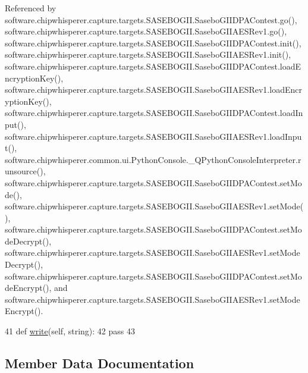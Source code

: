 Referenced by software.\+chipwhisperer.\+capture.\+targets.\+S\+A\+S\+E\+B\+O\+G\+I\+I.\+Sasebo\+G\+I\+I\+D\+P\+A\+Contest.\+go(), software.\+chipwhisperer.\+capture.\+targets.\+S\+A\+S\+E\+B\+O\+G\+I\+I.\+Sasebo\+G\+I\+I\+A\+E\+S\+Rev1.\+go(), software.\+chipwhisperer.\+capture.\+targets.\+S\+A\+S\+E\+B\+O\+G\+I\+I.\+Sasebo\+G\+I\+I\+D\+P\+A\+Contest.\+init(), software.\+chipwhisperer.\+capture.\+targets.\+S\+A\+S\+E\+B\+O\+G\+I\+I.\+Sasebo\+G\+I\+I\+A\+E\+S\+Rev1.\+init(), software.\+chipwhisperer.\+capture.\+targets.\+S\+A\+S\+E\+B\+O\+G\+I\+I.\+Sasebo\+G\+I\+I\+D\+P\+A\+Contest.\+load\+Encryption\+Key(), software.\+chipwhisperer.\+capture.\+targets.\+S\+A\+S\+E\+B\+O\+G\+I\+I.\+Sasebo\+G\+I\+I\+A\+E\+S\+Rev1.\+load\+Encryption\+Key(), software.\+chipwhisperer.\+capture.\+targets.\+S\+A\+S\+E\+B\+O\+G\+I\+I.\+Sasebo\+G\+I\+I\+D\+P\+A\+Contest.\+load\+Input(), software.\+chipwhisperer.\+capture.\+targets.\+S\+A\+S\+E\+B\+O\+G\+I\+I.\+Sasebo\+G\+I\+I\+A\+E\+S\+Rev1.\+load\+Input(), software.\+chipwhisperer.\+common.\+ui.\+Python\+Console.\+\_\+\+Q\+Python\+Console\+Interpreter.\+runsource(), software.\+chipwhisperer.\+capture.\+targets.\+S\+A\+S\+E\+B\+O\+G\+I\+I.\+Sasebo\+G\+I\+I\+D\+P\+A\+Contest.\+set\+Mode(), software.\+chipwhisperer.\+capture.\+targets.\+S\+A\+S\+E\+B\+O\+G\+I\+I.\+Sasebo\+G\+I\+I\+A\+E\+S\+Rev1.\+set\+Mode(), software.\+chipwhisperer.\+capture.\+targets.\+S\+A\+S\+E\+B\+O\+G\+I\+I.\+Sasebo\+G\+I\+I\+D\+P\+A\+Contest.\+set\+Mode\+Decrypt(), software.\+chipwhisperer.\+capture.\+targets.\+S\+A\+S\+E\+B\+O\+G\+I\+I.\+Sasebo\+G\+I\+I\+A\+E\+S\+Rev1.\+set\+Mode\+Decrypt(), software.\+chipwhisperer.\+capture.\+targets.\+S\+A\+S\+E\+B\+O\+G\+I\+I.\+Sasebo\+G\+I\+I\+D\+P\+A\+Contest.\+set\+Mode\+Encrypt(), and software.\+chipwhisperer.\+capture.\+targets.\+S\+A\+S\+E\+B\+O\+G\+I\+I.\+Sasebo\+G\+I\+I\+A\+E\+S\+Rev1.\+set\+Mode\+Encrypt().


\begin{DoxyCode}
41     \textcolor{keyword}{def }\hyperlink{classsoftware_1_1chipwhisperer_1_1capture_1_1targets_1_1simpleserial__readers_1_1__base_1_1SimpleSerialTemplate_adabf382161deaf538a2381ae5636847b}{write}(self, string):
42         \textcolor{keywordflow}{pass}
43 
\end{DoxyCode}


\subsection{Member Data Documentation}
\hypertarget{classsoftware_1_1chipwhisperer_1_1capture_1_1targets_1_1simpleserial__readers_1_1__base_1_1SimpleSerialTemplate_ad3d47613cabb8286d1c435703050daa8}{}
